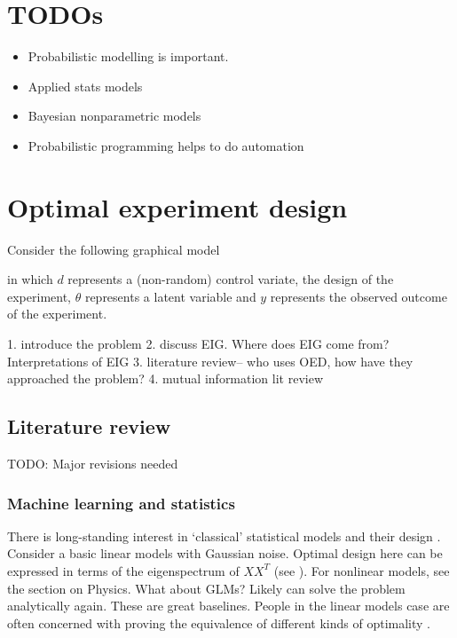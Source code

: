 \section{TODOs}

\begin{itemize}
	\item Probabilistic modelling is important.
	\item Applied stats models
	\item Bayesian nonparametric models
	\item Probabilistic programming helps to do automation
\end{itemize}


\section{Optimal experiment design}
Consider the following graphical model
\begin{center}
\end{center}
in which $d$ represents a (non-random) control variate, the design of the experiment, $\theta$ represents a latent variable and $y$ represents the observed outcome of the experiment.



1. introduce the problem
2. discuss EIG. Where does EIG come from? Interpretations of EIG
3. literature review-- who uses OED, how have they approached the problem?
4. mutual information lit review


\subsection{Literature review}
TODO: Major revisions needed

\subsubsection{Machine learning and statistics}
There is long-standing interest in `classical' statistical models and their design \cite{youssefreview}. Consider a basic linear models with Gaussian noise. Optimal design here can be expressed in terms of the eigenspectrum of $XX^T$ (see \cite{chaloner1984}). For nonlinear models, see the section on Physics. What about GLMs? Likely can solve the problem analytically again. These are great baselines. People in the linear models case are often concerned with proving the equivalence of different kinds of optimality \cite{youssefreview}.

